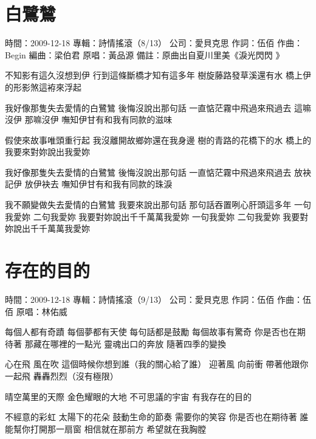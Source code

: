 \documentclass[UTF8,a4paper,oneside,twocolumn,12pt]{ctexbook}
\newcommand{\infopair}[2]{\textbullet #1：#2}
\newcommand{\zc}[1][伍佰]{\infopair{作詞}{#1}}
\newcommand{\zq}[1][伍佰]{\infopair{作曲}{#1}}
\newcommand{\bq}[1][伍佰]{\infopair{編曲}{#1}}
\newcommand{\zj}[1]{\infopair{專輯}{#1}}
\newcommand{\yc}[1]{\infopair{原唱}{#1}}
\newcommand{\sj}[1]{\infopair{時間}{#1}}
\newcommand{\bz}[1]{\infopair{備註}{#1}}
\newcommand{\gs}[1]{\infopair{公司}{#1}}
\newenvironment{info}{\begin{flushleft}\kaishu
	}
	{\end{flushleft}\normalsize\yahei\par}
\newenvironment{lyric}{
	}
{}
\begin{document}
\section{白鷺鷥}
\begin{info}
	\sj{2009-12-18}
	\zj{詩情搖滾（8/13）}
	\gs{愛貝克思}
	\zc
	\zq[Begin]
	\bq[梁伯君]
	\yc{黃品源}
	\bz{原曲出自夏川里美《淚光閃閃 》}
\end{info}
\begin{lyric}
	不知影有這久沒想到伊 行到這條斷橋才知有這多年
	樹旋藤路發草溪還有水 橋上伊的形影煞這袸來浮起

	我好像那隻失去愛情的白鷺鷥 後悔沒說出那句話
	一直惦茫霧中飛過來飛過去 這嘛沒伊 那嘛沒伊
	嘸知伊甘有和我有同款的滋味

	假使來故事唯頭重行起 我沒離開故鄉妳還在我身邊
	樹的青路的花橋下的水 橋上的我要來對妳說出我愛妳

	我好像那隻失去愛情的白鷺鷥 後悔沒說出那句話
	一直惦茫霧中飛過來飛過去 放袂記伊 放伊袂去
	嘸知伊甘有和我有同款的珠淚

	我不願變做失去愛情的白鷺鷥 我要來說出那句話
	那句話吞置咧心肝頭這多年
	一句我愛妳 二句我愛妳 我要對妳說出千千萬萬我愛妳
	一句我愛妳 二句我愛妳 我要對妳說出千千萬萬我愛妳
\end{lyric}

\section{存在的目的}
\begin{info}
	\sj{2009-12-18}
	\zj{詩情搖滾（9/13）}
	\gs{愛貝克思}
	\zc
	\zq
	\yc{林佑威}
\end{info}
\begin{lyric}
	每個人都有奇蹟 每個夢都有天使
	每句話都是鼓勵 每個故事有驚奇
	你是否也在期待著 那藏在哪裡的一點光
	靈魂出口的奔放 隨著四季的變換

	心在飛 風在吹 這個時候你想到誰（我的關心給了誰）
	迎著風 向前衝 帶著他跟你一起飛 轟轟烈烈（沒有極限）

	晴空萬里的天際 金色耀眼的大地
	不可思議的宇宙 有我存在的目的

	不經意的彩虹 太陽下的花朵
	鼓動生命的節奏 需要你的笑容
	你是否也在期待著 誰能幫你打開那一扇窗
	相信就在那前方 希望就在我胸膛
\end{lyric}
\end{document}
